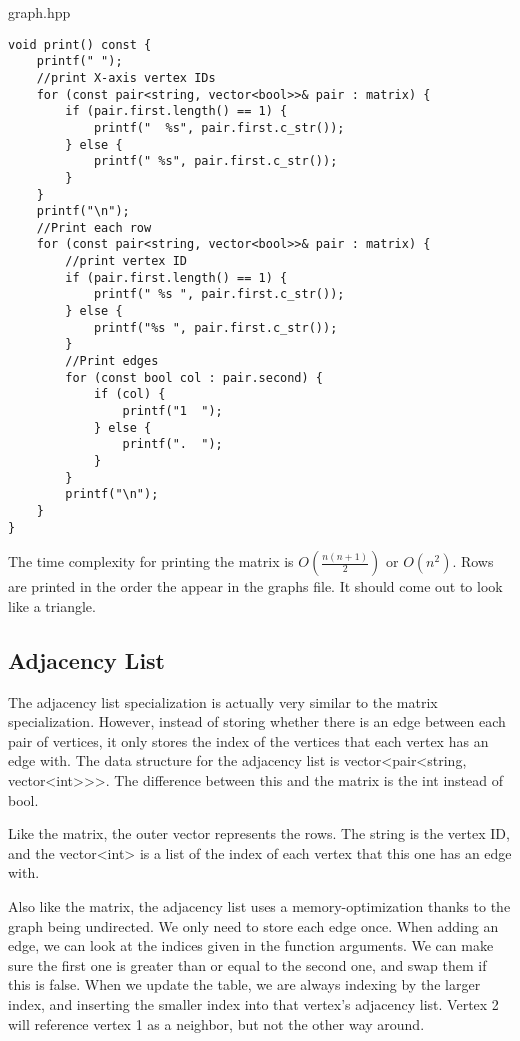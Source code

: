 \documentclass[letterpaper, 10pt,DIV=13]{scrartcl}
\numberwithin{equation}{section} %
\numberwithin{figure}{section} %
\numberwithin{table}{section} %
\begin{document}
graph.hpp
\begin{verbatim}
void print() const {
    printf(" ");
    //print X-axis vertex IDs
    for (const pair<string, vector<bool>>& pair : matrix) {
        if (pair.first.length() == 1) {
            printf("  %s", pair.first.c_str());
        } else {
            printf(" %s", pair.first.c_str());
        }
    }
    printf("\n");
    //Print each row
    for (const pair<string, vector<bool>>& pair : matrix) {
        //print vertex ID
        if (pair.first.length() == 1) {
            printf(" %s ", pair.first.c_str());
        } else {
            printf("%s ", pair.first.c_str());
        }
        //Print edges
        for (const bool col : pair.second) {
            if (col) {
                printf("1  ");
            } else {
                printf(".  ");
            }
        }
        printf("\n");
    }
}
\end{verbatim}

The time complexity for printing the matrix is $O(\frac{n(n+1)}{2})$ or $O(n^2)$. Rows are printed in the
order the appear in the graphs file. It should come out to look like a triangle.

\subsection{Adjacency List}
The adjacency list specialization is actually very similar to the matrix specialization. However, instead
of storing whether there is an edge between each pair of vertices, it only stores the index of the vertices
that each vertex has an edge with. The data structure for the adjacency list is
vector<pair<string, vector<int>>>. The difference between this and the matrix is the int instead of bool.

Like the matrix, the outer vector represents the rows. The string is the vertex ID, and the vector<int> is
a list of the index of each vertex that this one has an edge with.

Also like the matrix, the adjacency list uses a memory-optimization thanks to the graph being undirected.
We only need to store each edge once. When adding an edge, we can look at the indices given in the function
arguments. We can make sure the first one is greater than or equal to the second one, and swap them if this
is false. When we update the table, we are always indexing by the larger index, and inserting the smaller
index into that vertex's adjacency list. Vertex 2 will reference vertex 1 as a neighbor, but not the other
way around.
\end{document}
